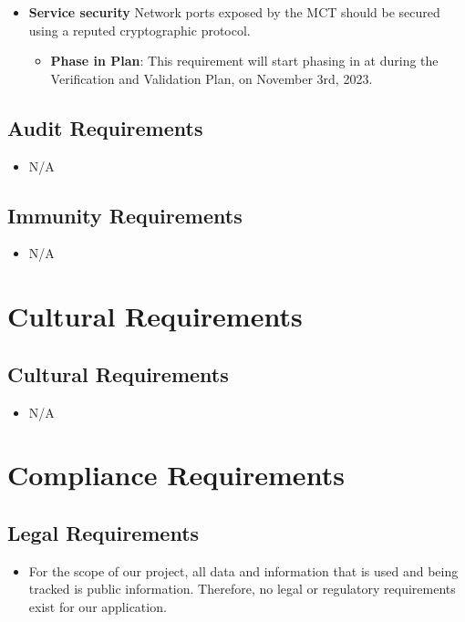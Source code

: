\documentclass[12pt]{article}
\begin{document}
\begin{itemize}
    \item \textbf{Service security} Network ports exposed by the MCT should be secured using a reputed cryptographic protocol.
    \begin{itemize}
        \item \textbf{Phase in Plan}: This requirement will start phasing in at during the Verification and Validation Plan, on November 3rd, 2023. 
    \end{itemize}
\end{itemize}


\subsection{Audit Requirements}
\begin{itemize}
    \item N/A
\end{itemize}
\subsection{Immunity Requirements}
\begin{itemize}
    \item N/A
\end{itemize}

\section{Cultural Requirements}
\subsection{Cultural Requirements}
\begin{itemize}
    \item N/A
\end{itemize}

\section{Compliance Requirements}
\subsection{Legal Requirements}
\begin{itemize}
    \item For the scope of our project, all data and information that is used and being tracked is public information. Therefore, no legal or regulatory requirements exist for our application. 
\end{itemize}
\end{document}
